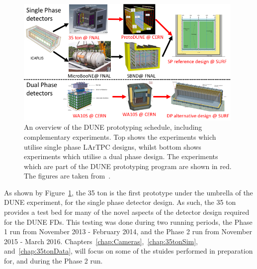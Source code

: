 \begin{figure}
  \centering
  \includegraphics[width=0.98\textwidth]{PrototypeSched}
  \caption[An overview of the DUNE prototyping schedule, including complementary experiments]
          {An overview of the DUNE prototyping schedule, including complementary experiments. Top shows the experiments which utilise single phase LArTPC designs, whilst bottom shows experiments which utilise a dual phase design. The experiments which are part of the DUNE prototyping program are shown in red. The figures are taken from~\citep{MarkReviewJuly2015, DUNECDR_V4}.}
  \label{fig:DUNEProtSched}
\end{figure}

As shown by Figure~\ref{fig:DUNEProtSched}, the 35 ton is the first prototype under the umbrella of the DUNE experiment, for the single phase detector design. As such, the 35 ton provides a test bed for many of the novel aspects of the detector design required for the DUNE FDs. This testing was done during two running periods, the Phase 1 run from November 2013 - February 2014, and the Phase 2 run from November 2015 - March 2016. Chapters~\ref{chap:Cameras},~\ref{chap:35tonSim}, and~\ref{chap:35tonData}, will focus on some of the stuides performed in preparation for, and during the Phase 2 run. \\ 

